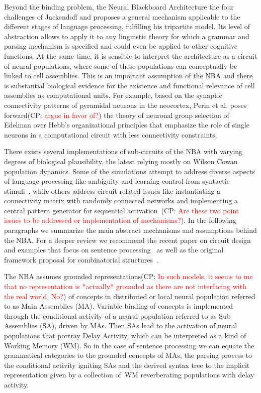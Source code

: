 \documentclass[10pt]{article}
\newcommand{\noteCP}[1]{(CP: \textcolor{red}{#1})}
\begin{document}
Beyond the binding problem, the Neural Blackboard Architecture the
four challenges of Jackendoff and proposes a general mechanism
applicable to the different stages of language processing, fulfilling
his tripartite model\cite{Jackendoff_2002a}. Its level of abstraction
allows to apply it to any linguistic theory for which a grammar and
parsing mechanism is specified and could even be applied to other
cognitive functions. At the same time, it is sensible to interpret the
architecture as a circuit of neural populations, where some of these
populations can conceptually be linked to cell assemblies. This is an
important assumption of the NBA and there is substantial biological
evidence for the existence and functional relevance of cell assemblies
as computational units\cite{Huyck_2013}. For example, based on the
synaptic connectivity patterns of pyramidal neurons in the neocortex,
Perin et al.\cite{Perin_2011} poses forward\noteCP{argue in favor of?}
the theory of neuronal group selection of
Edelman\cite{edelman1987neural} over Hebb's organizational
principles\cite{hebb2005organization} that emphasize the role of
single neurons in a computational circuit with less connectivity
constraints.

There exists several implementations of sub-circuits of the NBA with
varying degrees of biological plausibility, the latest relying mostly
on Wilson Cowan population dynamics\cite{Destexhe_2009}. Some of the
simulations attempt to address diverse aspects of language processing
like ambiguity\cite{Frank_2014} and learning control from syntactic
stimuli~\cite{van_der_Velde_2010}, while others address circuit
related issues like instantiating a connectivity matrix with randomly
connected networks\cite{van_der_Velde_2011} and implementing a central
pattern generator for sequential
activation~\cite{van_Dijk_2015}\noteCP{Are these two point issues to be
  addressed or implementation of mechanisms?}. In the following
paragraphs we summarize the main abstract mechanisms and
assumptions behind the NBA. For a deeper review we recommend the recent paper on circuit design and examples that focus on sentence
processing~\cite{de2015combinatorial} as well as the original framework
proposal for combinatorial structures~\cite{van_der_Velde_2006}.

The NBA assumes grounded representations\noteCP{In such models, it
  seems to me that no representation is *actually* grounded as there
  are not interfacing with the real world. No?} of concepts in
distributed or local neural population referred to as Main Assemblies
(MA). Variable binding of concepts is implemented through the
conditional activity of a neural population referred to as Sub
Assemblies (SA), driven by MAs. Then SAs lead to the activation of
neural populations that portray Delay Activity\cite{de_Kamps_2005},
which can be interpreted as a kind of Working Memory (WM). So in the case of
sentence processing we can equate the grammatical categories to the
grounded concepts of MAs, the parsing process to the conditional
activity igniting SAs and the derived syntax tree to the implicit
representation given by a collection of~WM reverberating populations
with delay activity.
\end{document}
